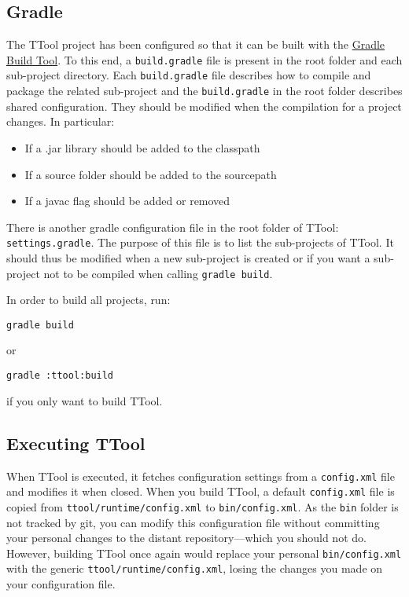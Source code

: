 \documentclass[12pt]{article}
\begin{document}
\subsection{Gradle}
The TTool project has been configured so that it can be built with the
\href{https://gradle.org/}{Gradle Build Tool}. To this end, a
\texttt{build.gradle} file
is present in the root folder and each sub-project directory. Each
\texttt{build.gradle} file describes how to compile and package the related
sub-project and the \texttt{build.gradle} in the root folder describes shared
configuration. They should be modified when the compilation for a project
changes. In particular:
\begin{itemize}
    \item If a .jar library should be added to the classpath
    \item If a source folder should be added to the sourcepath
    \item If a javac flag should be added or removed
\end{itemize}

There is another gradle configuration file in the root folder of TTool:
\texttt{settings.gradle}. The purpose of this file is to list the sub-projects
of TTool. It should thus be modified when a new sub-project is created or if you
want a sub-project not to be compiled when calling \texttt{gradle build}.

In order to build all projects, run:
\begin{verbatim}
gradle build
\end{verbatim}
or 
\begin{verbatim}
gradle :ttool:build
\end{verbatim}
if you only want to build TTool.

\subsection{Executing TTool}
When TTool is executed, it fetches configuration settings from a
\texttt{config.xml} file and modifies it when closed. When you build TTool, a
default \texttt{config.xml} file is copied from
\texttt{ttool/runtime/config.xml} to \texttt{bin/config.xml}. As the
\texttt{bin} folder is not tracked by git, you can modify this configuration
file without committing your personal changes to the distant repository---which
you should not do. However, building TTool once again would replace your
personal \texttt{bin/config.xml} with the generic
\texttt{ttool/runtime/config.xml}, losing the changes you made on your
configuration file.
\end{document}
